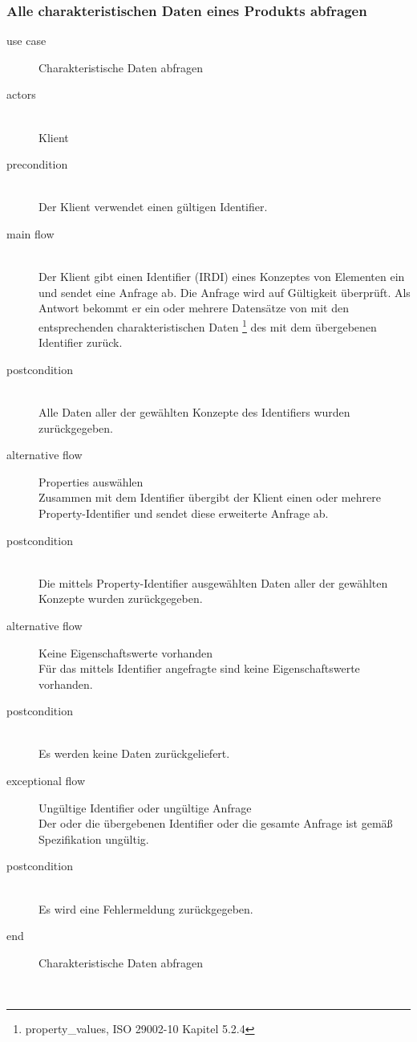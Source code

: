 \subsubsection{Alle charakteristischen Daten eines Produkts abfragen}

{\small

\begin{description}
     \item[use case] Charakteristische Daten abfragen
     \item[  actors]~\\
     Klient
     \item[  precondition]~\\
     Der Klient verwendet einen gültigen Identifier.
     \item[  main flow]~\\
     Der Klient gibt einen Identifier (\gls{IRDI}) eines Konzeptes von Elementen ein und sendet eine Anfrage ab. Die Anfrage wird auf Gültigkeit überprüft. Als Antwort bekommt er ein oder mehrere Datensätze von  mit den entsprechenden charakteristischen Daten \footnote{property\_values, ISO 29002-10 Kapitel 5.2.4} des  mit dem übergebenen Identifier zurück.
     \item[  postcondition]~\\
     Alle Daten aller  der gewählten Konzepte des Identifiers wurden zurückgegeben.    
     \item[  alternative flow] Properties auswählen ~\\
     Zusammen mit dem Identifier übergibt der Klient einen oder mehrere Property-Identifier und sendet diese erweiterte Anfrage ab.    
     \item[  postcondition]~\\
     Die mittels Property-Identifier ausgewählten Daten aller   der gewählten Konzepte wurden zurückgegeben.    
     \item[  alternative flow] Keine Eigenschaftswerte vorhanden ~\\
     Für das mittels Identifier angefragte  sind keine Eigenschaftswerte vorhanden.    
     \item[  postcondition]~\\
     Es werden keine Daten zurückgeliefert.   
     \item[  exceptional flow] Ungültige Identifier oder ungültige Anfrage ~\\
     Der oder die übergebenen Identifier oder die gesamte Anfrage ist gemäß Spezifikation ungültig.  
     \item[  postcondition]~\\
     Es wird eine Fehlermeldung zurückgegeben.  
     \item[end] Charakteristische Daten abfragen
\end{description}

~\\

} %

